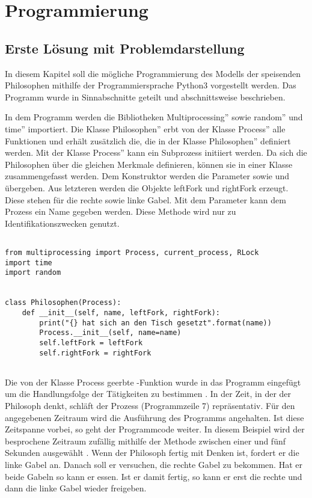\chapter{Programmierung}
\label{programmierung}
\section{Erste Lösung mit Problemdarstellung}
\label{erste_lösung}

In diesem Kapitel soll die mögliche Programmierung des Modells der speisenden Philosophen mithilfe der Programmiersprache Python3 vorgestellt werden. Das Programm wurde in Sinnabschnitte geteilt und abschnittsweise beschrieben.

In dem Programm werden die Bibliotheken \glqq Multiprocessing'' sowie \glqq random'' und \glqq time'' importiert. Die Klasse \glqq Philosophen'' erbt von der Klasse \glqq Process'' alle Funktionen und erhält zusätzlich die, die in der Klasse \glqq Philosophen'' definiert werden. Mit der Klasse \glqq Process'' kann ein Subprozess initiiert werden. Da sich die Philosophen über die gleichen Merkmale definieren, können sie in einer Klasse zusammengefasst werden. Dem Konstruktor werden die Parameter  sowie  und   übergeben. Aus letzteren werden die Objekte leftFork und rightFork erzeugt. Diese stehen für die rechte sowie linke Gabel. Mit dem Parameter  kann dem Prozess ein Name gegeben werden. \glqq Diese Methode wird nur zu Identifikationszwecken genutzt\grqq \parencite{lock}.

\begin{lstlisting}[style = Python, label = {Code_erste_lösung}, caption = {Klasse Philosophen}]

from multiprocessing import Process, current_process, RLock
import time
import random


class Philosophen(Process):
    def __init__(self, name, leftFork, rightFork):
        print("{} hat sich an den Tisch gesetzt".format(name))
        Process.__init__(self, name=name)
        self.leftFork = leftFork
        self.rightFork = rightFork
        
\end{lstlisting}

Die von der Klasse \glqq Process \grqq geerbte  -Funktion wurde in das Programm eingefügt um die Handlungsfolge der Tätigkeiten zu bestimmen \parencite[vgl.]{lock} . In der Zeit, in der der Philosoph denkt, schläft der Prozess (Programmzeile 7) repräsentativ. Für den angegebenen Zeitraum wird die Ausführung des Programms angehalten. Ist diese Zeitspanne vorbei, so geht der Programmcode weiter. In diesem Beispiel wird der besprochene Zeitraum zufällig mithilfe der  Methode zwischen einer und fünf Sekunden ausgewählt \parencite[vgl.]{sleep}. Wenn der Philosoph fertig mit Denken ist, fordert er die linke Gabel an. Danach soll er versuchen, die rechte Gabel zu bekommen. Hat er beide Gabeln so kann er essen. Ist er damit fertig, so kann er erst die rechte und dann die linke Gabel wieder freigeben.

